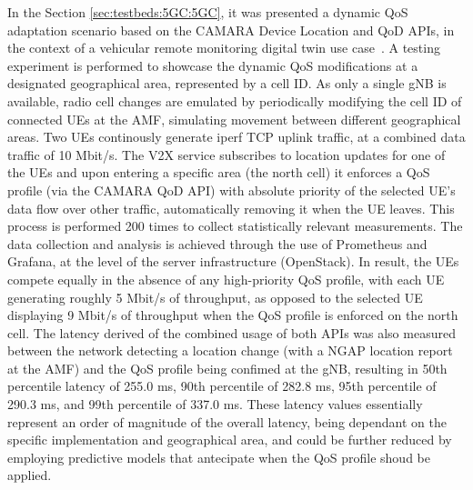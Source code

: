 In the Section \ref{sec:testbeds:5GC:5GC}, it was presented a dynamic \acs{QoS} adaptation scenario based on the CAMARA Device Location and \acs{QoD} \acsp{API}, in the context of a vehicular remote monitoring digital twin use case~\cite{DynamicQoSAdaptationviaExposedServiceAPIs}. A testing experiment is performed to showcase the dynamic \acs{QoS} modifications at a designated geographical area, represented by a cell ID. As only a single \acs{gNB} is available, radio cell changes are emulated by periodically modifying the cell ID of connected \acsp{UE} at the \acs{AMF}, simulating movement between different geographical areas. Two \acsp{UE} continously generate iperf \acs{TCP} uplink traffic, at a combined data traffic of 10 Mbit/s. The \acs{V2X} service subscribes to location updates for one of the \acsp{UE} and upon entering a specific area (the north cell) it enforces a \acs{QoS} profile (via the CAMARA \acs{QoD} \acs{API}) with absolute priority of the selected \acs{UE}'s data flow over other traffic, automatically removing it when the \acs{UE} leaves. This process is performed 200 times to collect statistically relevant measurements. The data collection and analysis is achieved through the use of Prometheus and Grafana, at the level of the server infrastructure (OpenStack). In result, the \acsp{UE} compete equally in the absence of any high-priority \acs{QoS} profile, with each \acs{UE} generating roughly 5 Mbit/s of throughput, as opposed to the selected \acs{UE} displaying 9 Mbit/s of throughput when the \acs{QoS} profile is enforced on the north cell. The latency derived of the combined usage of both \acsp{API} was also measured between the network detecting a location change (with a \acs{NGAP} location report at the \acs{AMF}) and the \acs{QoS} profile being confimed at the \acs{gNB}, resulting in 50th percentile latency of 255.0 ms, 90th percentile of 282.8 ms, 95th percentile of 290.3 ms, and 99th percentile of 337.0 ms. These latency values essentially represent an order of magnitude of the overall latency, being dependant on the specific implementation and geographical area, and could be further reduced by employing predictive models that antecipate when the \acs{QoS} profile shoud be applied.

